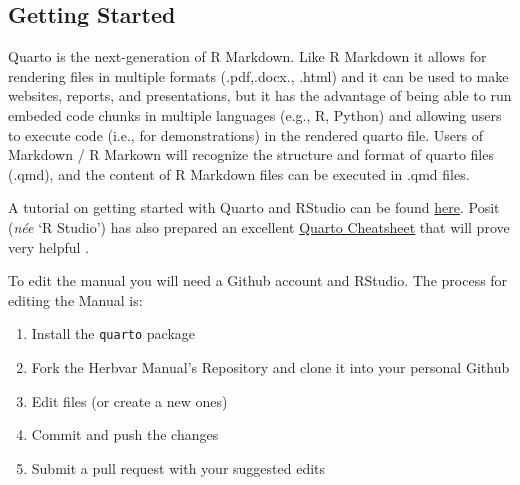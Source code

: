 \documentclass[
  letterpaper,
  DIV=11,
  numbers=noendperiod]{scrreprt}
\providecommand{\tightlist}{%
  \setlength{\itemsep}{0pt}\setlength{\parskip}{0pt}}\usepackage{longtable,booktabs,array}
\begin{document}
\subsection{Getting Started}\label{getting-started}

Quarto is the next-generation of R Markdown. Like R Markdown it allows
for rendering files in multiple formats (.pdf,.docx., .html) and it can
be used to make websites, reports, and presentations, but it has the
advantage of being able to run embeded code chunks in multiple languages
(e.g., R, Python) and allowing users to execute code (i.e., for
demonstrations) in the rendered quarto file. Users of Markdown / R
Markown will recognize the structure and format of quarto files (.qmd),
and the content of R Markdown files can be executed in .qmd files.

\begin{tcolorbox}[enhanced jigsaw, toptitle=1mm, colback=white, left=2mm, opacityback=0, toprule=.15mm, opacitybacktitle=0.6, leftrule=.75mm, colbacktitle=quarto-callout-tip-color!10!white, colframe=quarto-callout-tip-color-frame, title=\textcolor{quarto-callout-tip-color}{\faLightbulb}\hspace{0.5em}{Tip}, bottomtitle=1mm, rightrule=.15mm, breakable, titlerule=0mm, arc=.35mm, bottomrule=.15mm, coltitle=black]

A tutorial on getting started with Quarto and RStudio can be found
\href{https://quarto.org/docs/get-started/hello/rstudio.html}{here}.
Posit (\emph{née} `R Studio') has also prepared an excellent
\href{https://rstudio.github.io/cheatsheets/html/quarto.html}{Quarto
Cheatsheet} that will prove very helpful .

\end{tcolorbox}

To edit the manual you will need a Github account and RStudio. The
process for editing the Manual is:

\begin{enumerate}
\def\labelenumi{\arabic{enumi}.}
\tightlist
\item
  Install the \texttt{quarto} package
\item
  Fork the Herbvar Manual's Repository and clone it into your personal
  Github
\item
  Edit files (or create a new ones)
\item
  Commit and push the changes
\item
  Submit a pull request with your suggested edits
\end{enumerate}
\end{document}
